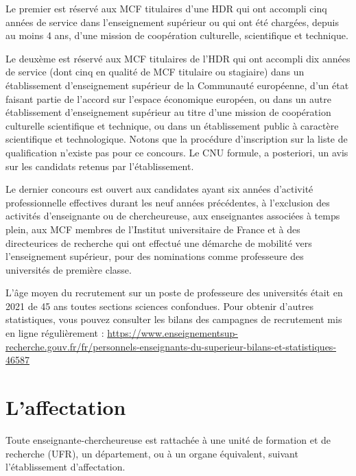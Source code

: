Le premier est r\'eserv\'e
aux MCF titulaires d'une HDR qui ont accompli cinq ann\'ees de service dans l'enseignement sup\'erieur ou qui ont \'et\'e charg\'e\mp e\mp s, 
depuis au moins 4 ans, d'une mission de coop\'eration culturelle,
scientifique et technique.

Le deux\`eme est r\'eserv\'e aux MCF titulaires de l'HDR qui ont accompli dix ann\'ees de service
(dont cinq en qualit\'e de MCF titulaire ou stagiaire) dans un \'etablissement d'enseignement sup\'erieur
de la Communaut\'e europ\'eenne, d'un \'etat faisant partie de l'accord sur l'espace \'economique
europ\'een,
ou dans un autre \'etablissement d'enseignement sup\'erieur au titre d'une mission de coop\'eration culturelle scientifique et technique, 
ou dans un \'etablissement public \`a caract\`ere scientifique et technologique.
Notons que la proc\'edure d'inscription sur la liste de qualification n'existe pas pour ce concours.
Le CNU formule, a posteriori, un avis sur les candidats retenus par l'\'etablissement.

Le dernier concours est ouvert
aux candidat\mp e\mp s ayant six ann\'ees d'activit\'e professionnelle effectives
durant les neuf ann\'ees pr\'ec\'edentes,
\`a l'exclusion des activit\'es d'enseignant\mp e ou de chercheur\mp euse,
aux enseignant\mp e\mp s associ\'e\mp e\mp s \`a temps plein,
aux MCF membres de l'Institut universitaire de France
et \`a des directeur\mp ice\mp s de recherche qui ont effectu\'e une d\'emarche de mobilit\'e
vers l'enseignement sup\'erieur, pour des nominations comme professeur\mp e des universit\'es de premi\`ere classe.

L'\^age moyen du recrutement sur un poste de  professeur\mp e des
universit\'es \'etait en 2021 de 45 ans toutes sections sciences confondues. Pour obtenir d'autres statistiques, vous pouvez consulter les bilans des campagnes de recrutement mis en ligne r\'e\-gu\-li\`erement :
{\url{https://www.enseignementsup-recherche.gouv.fr/fr/personnels-enseignants-du-superieur-bilans-et-statistiques-46587}}

\section{L'affectation}

Tout\mp e enseignant\mp e-chercheur\mp euse est rattach\'e\mp e \`a une unit\'e de formation
et de recherche (UFR), un d\'epar\-te\-ment, ou \`a un organe
\'equivalent, suivant l'\'etablissement d'affectation.

